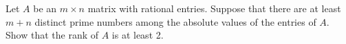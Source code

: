 Let $A$ be an $m \times n$ matrix with rational entries.
Suppose that there are at least $m+n$ distinct prime numbers among the absolute values of the entries of $A$. Show that the rank of $A$ is at least 2.
